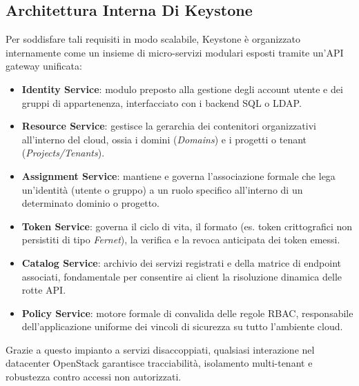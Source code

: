 \documentclass[11pt, a4paper]{article}
\begin{document}
\subsection{Architettura Interna Di Keystone}

Per soddisfare tali requisiti in modo scalabile, Keystone è organizzato internamente come un insieme di micro-servizi modulari esposti tramite un'API gateway unificata:


\begin{itemize}
    \item \textbf{Identity Service}: modulo preposto alla gestione degli account utente e dei gruppi di appartenenza, interfacciato con i backend SQL o LDAP.
    \item \textbf{Resource Service}: gestisce la gerarchia dei contenitori organizzativi all'interno del cloud, ossia i domini (\emph{Domains}) e i progetti o tenant (\emph{Projects/Tenants}).
    \item \textbf{Assignment Service}: mantiene e governa l'associazione formale che lega un'identità (utente o gruppo) a un ruolo specifico all'interno di un determinato dominio o progetto.
    \item \textbf{Token Service}: governa il ciclo di vita, il formato (es. token crittografici non persistiti di tipo \emph{Fernet}), la verifica e la revoca anticipata dei token emessi.
    \item \textbf{Catalog Service}: archivio dei servizi registrati e della matrice di endpoint associati, fondamentale per consentire ai client la risoluzione dinamica delle rotte API.
    \item \textbf{Policy Service}: motore formale di convalida delle regole RBAC, responsabile dell'applicazione uniforme dei vincoli di sicurezza su tutto l'ambiente cloud.
\end{itemize}

Grazie a questo impianto a servizi disaccoppiati, qualsiasi interazione nel datacenter OpenStack garantisce tracciabilità, isolamento multi-tenant e robustezza contro accessi non autorizzati.


\end{document}
